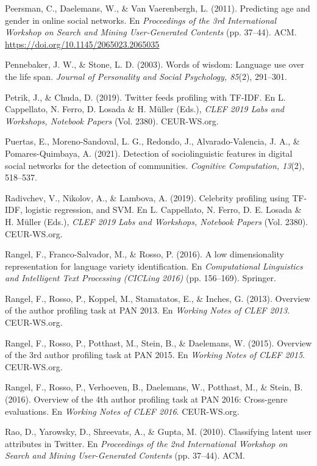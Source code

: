 \documentclass[10pt,twocolumn]{article}
\begin{document}
\begin{list}{}{\setlength{\leftmargin}{1.5em}\setlength{\itemindent}{-1.5em}\setlength{\itemsep}{2pt}\setlength{\parsep}{0pt}}
\item Peersman, C., Daelemans, W., \& Van Vaerenbergh, L. (2011). Predicting age and gender in online social networks. En \textit{Proceedings of the 3rd International Workshop on Search and Mining User-Generated Contents} (pp. 37–44). ACM. \url{https://doi.org/10.1145/2065023.2065035} \textdagger{}
\item Pennebaker, J. W., \& Stone, L. D. (2003). Words of wisdom: Language use over the life span. \textit{Journal of Personality and Social Psychology, 85}(2), 291–301.
\item Petrik, J., \& Chuda, D. (2019). Twitter feeds profiling with TF-IDF. En L. Cappellato, N. Ferro, D. Losada \& H. Müller (Eds.), \textit{CLEF 2019 Labs and Workshops, Notebook Papers} (Vol. 2380). CEUR-WS.org. \textdagger{}
\item Puertas, E., Moreno-Sandoval, L. G., Redondo, J., Alvarado-Valencia, J. A., \& Pomares-Quimbaya, A. (2021). Detection of sociolinguistic features in digital social networks for the detection of communities. \textit{Cognitive Computation, 13}(2), 518–537. \textdagger{}
\item Radivchev, V., Nikolov, A., \& Lambova, A. (2019). Celebrity profiling using TF-IDF, logistic regression, and SVM. En L. Cappellato, N. Ferro, D. E. Losada \& H. Müller (Eds.), \textit{CLEF 2019 Labs and Workshops, Notebook Papers} (Vol. 2380). CEUR-WS.org. \textdagger{}
\item Rangel, F., Franco-Salvador, M., \& Rosso, P. (2016). A low dimensionality representation for language variety identification. En \textit{Computational Linguistics and Intelligent Text Processing (CICLing 2016)} (pp. 156–169). Springer.
\item Rangel, F., Rosso, P., Koppel, M., Stamatatos, E., \& Inches, G. (2013). Overview of the author profiling task at PAN 2013. En \textit{Working Notes of CLEF 2013}. CEUR-WS.org.
\item Rangel, F., Rosso, P., Potthast, M., Stein, B., \& Daelemans, W. (2015). Overview of the 3rd author profiling task at PAN 2015. En \textit{Working Notes of CLEF 2015}. CEUR-WS.org.
\item Rangel, F., Rosso, P., Verhoeven, B., Daelemans, W., Potthast, M., \& Stein, B. (2016). Overview of the 4th author profiling task at PAN 2016: Cross-genre evaluations. En \textit{Working Notes of CLEF 2016}. CEUR-WS.org.
\item Rao, D., Yarowsky, D., Shreevats, A., \& Gupta, M. (2010). Classifying latent user attributes in Twitter. En \textit{Proceedings of the 2nd International Workshop on Search and Mining User-Generated Contents} (pp. 37–44). ACM.

\end{list}
\end{document}
